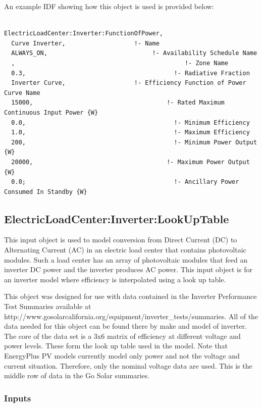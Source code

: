 An example IDF showing how this object is used is provided below:

\begin{lstlisting}

ElectricLoadCenter:Inverter:FunctionOfPower,
  Curve Inverter,                   !- Name
  ALWAYS_ON,                             !- Availability Schedule Name
  ,                                               !- Zone Name
  0.3,                                         !- Radiative Fraction
  Inverter Curve,                   !- Efficiency Function of Power Curve Name
  15000,                                     !- Rated Maximum Continuous Input Power {W}
  0.0,                                         !- Minimum Efficiency
  1.0,                                         !- Maximum Efficiency
  200,                                         !- Minimum Power Output {W}
  20000,                                     !- Maximum Power Output {W}
  0.0;                                         !- Ancillary Power Consumed In Standby {W}
\end{lstlisting}

\subsection{ElectricLoadCenter:Inverter:LookUpTable}\label{electricloadcenterinverterlookuptable}

This input object is used to model conversion from Direct Current (DC) to Alternating Current (AC) in an electric load center that contains photovoltaic modules. Such a load center has an array of photovoltaic modules that feed an inverter DC power and the inverter produces AC power. This input object is for an inverter model where efficiency is interpolated using a look up table.

This object was designed for use with data contained in the Inverter Performance Test Summaries available at http://www.gosolarcalifornia.org/equipment/inverter\_tests/summaries. All of the data needed for this object can be found there by make and model of inverter. The core of the data set is a 3x6 matrix of efficiency at different voltage and power levels. These form the look up table used in the model. Note that EnergyPlus PV models currently model only power and not the voltage and current situation. Therefore, only the nominal voltage data are used. This is the middle row of data in the Go Solar summaries.

\subsubsection{Inputs}\label{inputs-5-008}

